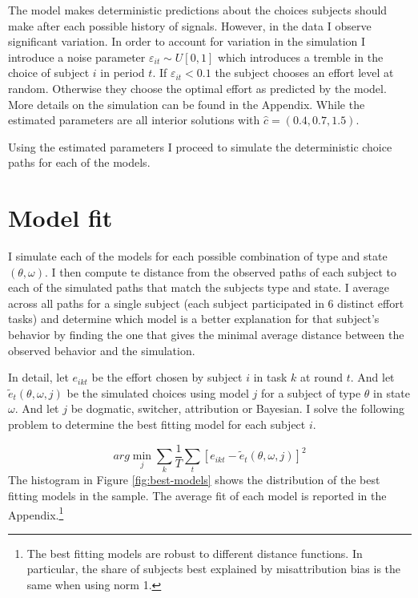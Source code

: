 \documentclass[
  12pt,
]{article}
\begin{document}
The model makes deterministic predictions about the choices subjects
should make after each possible history of signals. However, in the data
I observe significant variation. In order to account for variation in
the simulation I introduce a noise parameter
\(\varepsilon_{it}\sim U[0, 1]\) which introduces a tremble in the
choice of subject \(i\) in period \(t\). If \(\varepsilon_{it}<0.1\) the
subject chooses an effort level at random. Otherwise they choose the
optimal effort as predicted by the model. More details on the simulation
can be found in the Appendix. While the estimated parameters are all
interior solutions with \(\hat{c} = (0.4, 0.7, 1.5)\).

Using the estimated parameters I proceed to simulate the deterministic
choice paths for each of the models.

\hypertarget{model-fit}{%
\section{Model fit}\label{model-fit}}

I simulate each of the models for each possible combination of type and
state \((\theta, \omega)\). I then compute te distance from the observed
paths of each subject to each of the simulated paths that match the
subjects type and state. I average across all paths for a single subject
(each subject participated in 6 distinct effort tasks) and determine
which model is a better explanation for that subject's behavior by
finding the one that gives the minimal average distance between the
observed behavior and the simulation.

In detail, let \(e_{ikt}\) be the effort chosen by subject \(i\) in task
\(k\) at round \(t\). And let \(\tilde{e}_{t}(\theta, \omega, j)\) be
the simulated choices using model \(j\) for a subject of type \(\theta\)
in state \(\omega\). And let \(j\) be dogmatic, switcher, attribution or
Bayesian. I solve the following problem to determine the best fitting
model for each subject \(i\).

\[ arg\min_j \sum_k \frac{1}{T}\sum_t{\left[e_{ikt}-\tilde{e}_{t}(\theta, \omega, j)\right]^2} \]
The histogram in Figure \ref{fig:best-models} shows the distribution of
the best fitting models in the sample. The average fit of each model is
reported in the
Appendix.\footnote{The best fitting models are robust to different distance functions. In particular, the share of subjects best explained by misattribution bias is the same when using norm 1.}
\end{document}

